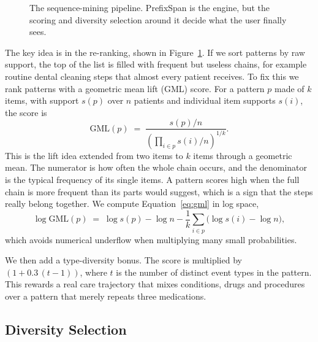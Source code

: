 \begin{figure}[t]
\centering
{}
\caption{The sequence-mining pipeline. PrefixSpan is the engine, but the scoring and diversity selection around it decide what the user finally sees.}
\label{fig:pipeline}
\end{figure}

The key idea is in the re-ranking, shown in Figure~\ref{fig:pipeline}. If we sort patterns by raw support, the top of the list is filled with frequent but useless chains, for example routine dental cleaning steps that almost every patient receives. To fix this we rank patterns with a geometric mean lift (GML) score. For a pattern $p$ made of $k$ items, with support $s(p)$ over $n$ patients and individual item supports $s(i)$, the score is
\begin{equation}
\mathrm{GML}(p) \;=\; \frac{s(p)/n}{\left(\displaystyle\prod_{i \in p} s(i)/n \right)^{1/k}} .
\label{eq:gml}
\end{equation}
This is the lift idea extended from two items to $k$ items through a geometric mean. The numerator is how often the whole chain occurs, and the denominator is the typical frequency of its single items. A pattern scores high when the full chain is more frequent than its parts would suggest, which is a sign that the steps really belong together. We compute Equation~\ref{eq:gml} in log space,
\begin{equation}
\log \mathrm{GML}(p) \;=\; \log s(p) - \log n - \frac{1}{k}\sum_{i \in p}\big(\log s(i) - \log n\big),
\end{equation}
which avoids numerical underflow when multiplying many small probabilities.

We then add a type-diversity bonus. The score is multiplied by $(1 + 0.3\,(t-1))$, where $t$ is the number of distinct event types in the pattern. This rewards a real care trajectory that mixes conditions, drugs and procedures over a pattern that merely repeats three medications.

\subsection{Diversity Selection}

